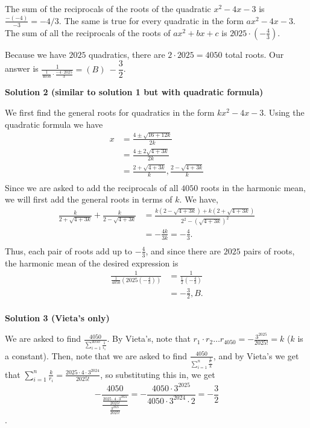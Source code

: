 \begin{enumerate}
 The sum of the reciprocals of the roots of the quadratic $x^2-4x-3$ is $\frac{-(-4)}{-3} = -4/3.$ The same is true for every quadratic in the form $ax^2-4x-3$. The sum of all the reciprocals of the roots of $ax^2+bx+c$ is $2025 \cdot \left(-\frac{4}{3}\right).$

 Because we have $2025$ quadratics, there are $2 \cdot 2025 = 4050$ total roots. Our answer is $\frac{1}{\frac{1}{4050}\cdot \frac{-4\cdot 2025}{3}} =\boxed{(B)\ -\dfrac{3}{2}}$.

 



\textbf{Solution 2 (similar to solution 1 but with quadratic formula)}

We first find the general roots for quadratics in the form $kx^2-4x-3$. Using the quadratic formula we have \begin{align*}x&=\frac{4 \pm \sqrt{16+12k}}{2k} \\&= \frac{4\pm 2\sqrt{4+3k}}{2k} \\&= \frac{2+\sqrt{4+3k}}{k}, \frac{2-\sqrt{4+3k}}{k} \\\end{align*}
Since we are asked to add the reciprocals of all $4050$ roots in the harmonic mean, we will first add the general roots in terms of $k$. We have,\begin{align*}\frac{k}{2+\sqrt{4+3k}} + \frac{k}{2-\sqrt{4+3k}} &= \frac{k(2-\sqrt{4+3k}) + k(2+\sqrt{4+3k})}{2^2-(\sqrt{4+3k})^2} \\&= -\frac{4k}{3k}=-\frac{4}{3}. \\\end{align*}
Thus, each pair of roots add up to $-\frac{4}{3}$, and since there are $2025$ pairs of roots, the harmonic mean of the desired expression is \begin{align*}\frac{1}{\frac{1}{4050} \left (2025 \left (-\frac43 \right ) \right)} &= \frac{1}{\frac12 \left ( -\frac43 \right)} \\& = \boxed{-\frac32}, \boxed{B}. \\\end{align*}


 



\textbf{Solution 3 (Vieta's only)}

We are asked to find $\frac{4050}{\sum_{i=1}^{4050}\frac{1}{i_1}}$. By Vieta's, note that $r_1 \cdot r_2 \dots r_{4050} = -\frac{3^{2025}}{2025!} = k$ ($k$ is a constant). Then, note that we are asked to find $\frac{4050}{\sum_{i=1}^n \frac{\frac{k}{r_i}}{k}}$, and by Vieta's we get that $\sum_{i=1}^n \frac{k}{r_i} = \frac{2025 \cdot 4 \cdot 3^{2024}}{2025!}$, so substituting this in, we get 
 \[-\frac{4050}{\frac{\frac{2025 \cdot 4 \cdot 3^{2024}}{2025!}}{\frac{3^{2025}}{2025!}}} = -\frac{4050 \cdot 3^{2025}}{4050 \cdot 3^{2024} \cdot 2} = \boxed{-\frac{3}{2}}\].


\end{enumerate}
